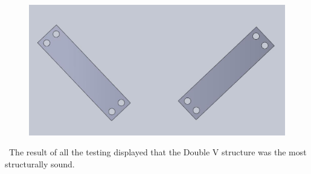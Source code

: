 \documentclass[letterpaper,12pt]{article}
\begin{document}
\begin{figure}[!htbp]\centering
\begin{minipage}{.5\textwidth}\centering
\includegraphics[width=.8\textwidth]{single-accent.JPG}
\label{single-accent}
\end{minipage}
\end{figure}
\
The result of all the testing displayed that the Double V structure was the most structurally sound. 
\end{document}
